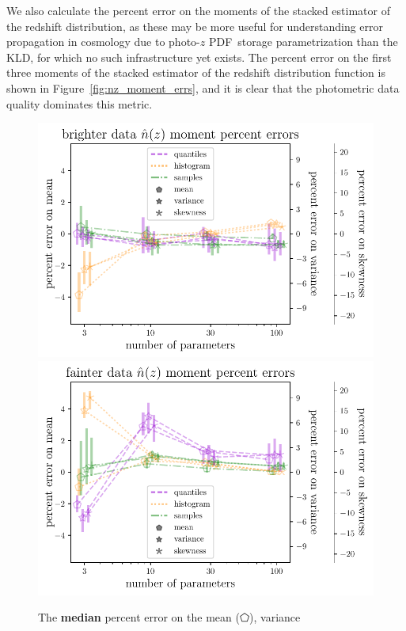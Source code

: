 \documentclass[\docopts]{\docclass}
\newcommand{\pz}{photo-$z$ PDF}
\begin{document}
We also calculate the percent error on the moments of the stacked estimator of 
the redshift distribution, as these may be more useful for understanding error 
propagation in cosmology due to \pz\ storage parametrization than the KLD, for 
which no such infrastructure yet exists.
The percent error on the first three moments of the stacked estimator of the 
redshift distribution function is shown in Figure~\ref{fig:nz_moment_errs}, and 
it is clear that the photometric data quality dominates this metric.
\begin{figure}
  \begin{center}
    \includegraphics[width=\columnwidth]{graham_nz_err.pdf}    
\includegraphics[width=\columnwidth]{schmidt_nz_err.pdf}
    \caption{
    The \textbf{median} percent error on the mean ($\pentagon$), variance 
}
\end{center}
\end{figure}
\end{document}
